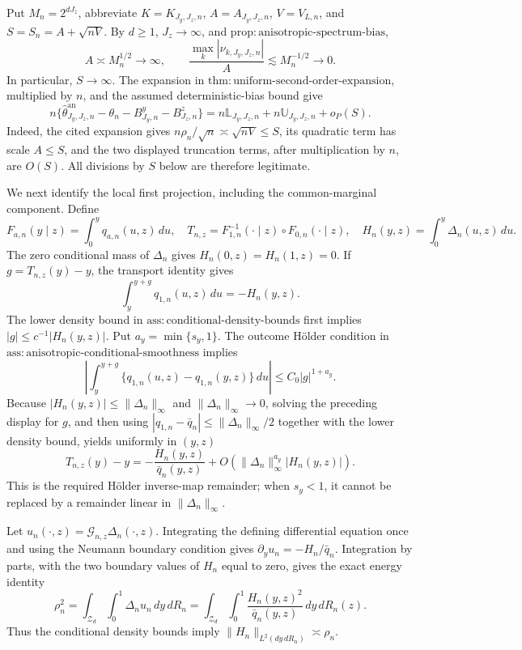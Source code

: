 Put \(M_n=2^{dJ_z}\), abbreviate \(K=K_{J_y,J_z,n}\), \(A=A_{J_y,J_z,n}\), \(V=V_{L,n}\), and \(S=S_n=A+\sqrt{nV}\).  By \(d\ge1\), \(J_z\to\infty\), and \(\mathrm{prop{:}anisotropic\text{-}spectrum\text{-}bias}\),
\[
A\asymp M_n^{1/2}\longrightarrow\infty,
\qquad
\frac{\max_k|\nu_{k,J_y,J_z,n}|}{A}\lesssim M_n^{-1/2}\longrightarrow0.
\tag{24}
\]
In particular, \(S\to\infty\).  The expansion in \(\mathrm{thm{:}uniform\text{-}second\text{-}order\text{-}expansion}\), multiplied by \(n\), and the assumed deterministic-bias bound give
\[
n\{\widehat\theta^{\mathrm{an}}_{J_y,J_z,n}-\theta_n-B^y_{J_y,n}-B^z_{J_z,n}\}
=n\mathbb L_{J_y,J_z,n}+n\mathbb U_{J_y,J_z,n}+o_P(S).
\tag{25}
\]
Indeed, the cited expansion gives \(n\rho_n/\sqrt n\asymp\sqrt{nV}\le S\), its quadratic term has scale \(A\le S\), and the two displayed truncation terms, after multiplication by \(n\), are \(O(S)\).  All divisions by \(S\) below are therefore legitimate.

We next identify the local first projection, including the common-marginal component.  Define
\[
F_{a,n}(y\mid z)=\int_0^yq_{a,n}(u,z)\,du,
\quad
T_{n,z}=F_{1,n}^{-1}(\cdot\mid z)\circ F_{0,n}(\cdot\mid z),
\quad
H_n(y,z)=\int_0^y\Delta_n(u,z)\,du.
\]
The zero conditional mass of \(\Delta_n\) gives \(H_n(0,z)=H_n(1,z)=0\).  If \(g=T_{n,z}(y)-y\), the transport identity gives
\[
\int_y^{y+g}q_{1,n}(u,z)\,du=-H_n(y,z).
\]
The lower density bound in \(\mathrm{ass{:}conditional\text{-}density\text{-}bounds}\) first implies \(|g|\le c^{-1}|H_n(y,z)|\).  Put \(a_y=\min\{s_y,1\}\).  The outcome H\"older condition in \(\mathrm{ass{:}anisotropic\text{-}conditional\text{-}smoothness}\) implies
\[
\left|\int_y^{y+g}\{q_{1,n}(u,z)-q_{1,n}(y,z)\}\,du\right|
\le C_0|g|^{1+a_y}.
\]
Because \(|H_n(y,z)|\le\|\Delta_n\|_\infty\) and \(\|\Delta_n\|_\infty\to0\), solving the preceding display for \(g\), and then using \(|q_{1,n}-\bar q_n|\le\|\Delta_n\|_\infty/2\) together with the lower density bound, yields uniformly in \((y,z)\)
\[
T_{n,z}(y)-y
=-\frac{H_n(y,z)}{\bar q_n(y,z)}
+O\!\left(\|\Delta_n\|_\infty^{a_y}|H_n(y,z)|\right).
\tag{26}
\]
This is the required H\"older inverse-map remainder; when \(s_y<1\), it cannot be replaced by a remainder linear in \(\|\Delta_n\|_\infty\).

Let \(u_n(\cdot,z)=\mathcal G_{n,z}\Delta_n(\cdot,z)\).  Integrating the defining differential equation once and using the Neumann boundary condition gives \(\partial_yu_n=-H_n/\bar q_n\).  Integration by parts, with the two boundary values of \(H_n\) equal to zero, gives the exact energy identity
\[
\rho_n^2
=\int_{\mathcal Z_d}\int_0^1\Delta_nu_n\,dy\,dR_n
=\int_{\mathcal Z_d}\int_0^1\frac{H_n(y,z)^2}{\bar q_n(y,z)}\,dy\,dR_n(z).
\tag{27}
\]
Thus the conditional density bounds imply \(\|H_n\|_{L^2(dy\,dR_n)}\asymp\rho_n\).

